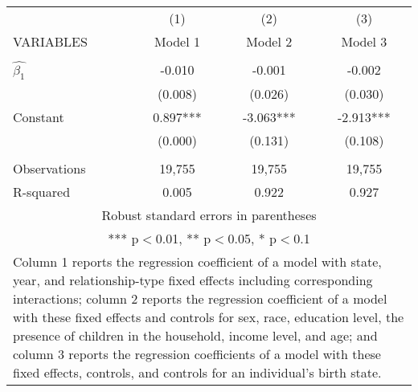 \begin{tabular}{lccc}
\hline
 & (1) & (2) & (3) \\
VARIABLES & Model 1 & Model 2 & Model 3 \\ \hline
 &  &  &  \\
$\hat{\beta_1}$ & -0.010 & -0.001 & -0.002 \\
 & (0.008) & (0.026) & (0.030) \\
Constant & 0.897*** & -3.063*** & -2.913*** \\
 & (0.000) & (0.131) & (0.108) \\
 &  &  &  \\
Observations & 19,755 & 19,755 & 19,755 \\
 R-squared & 0.005 & 0.922 & 0.927 \\ \hline
\multicolumn{4}{c}{ Robust standard errors in parentheses} \\
\multicolumn{4}{c}{ *** p$<$0.01, ** p$<$0.05, * p$<$0.1} \\
\multicolumn{4}{p{0.8\linewidth}}{\small Column 1 reports the regression coefficient of a model with state, year, and relationship-type fixed effects including corresponding interactions; column 2 reports the regression coefficient of a model with these fixed effects and controls for sex, race, education level, the presence of children in the household, income level, and age; and column 3 reports the regression coefficients of a model with these fixed effects, controls, and controls for an individual’s birth state.} \\
\end{tabular}
